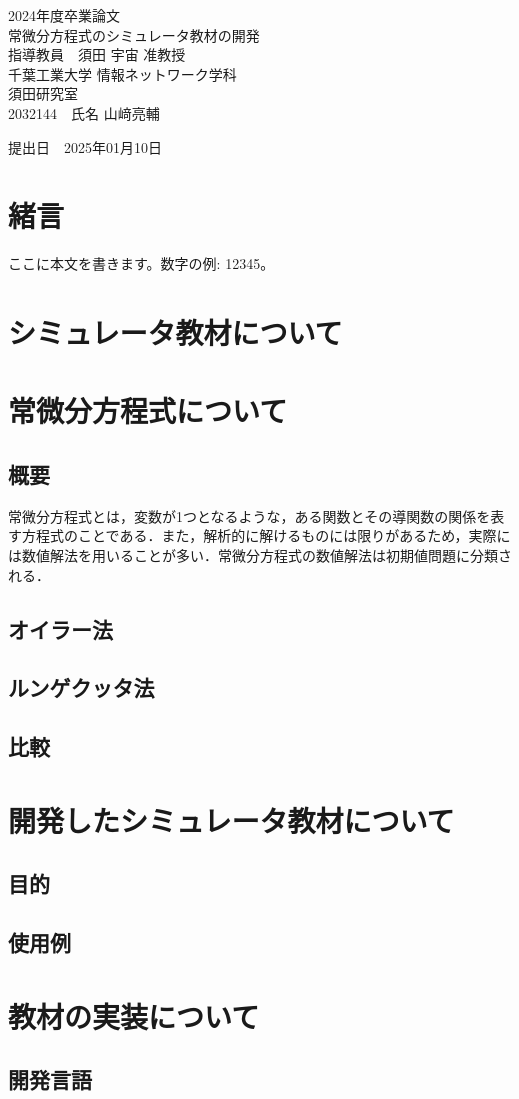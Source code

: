 \documentclass[a4paper, 12pt]{ltjsarticle}
\newcommand{\coverpage}{
\begin{titlepage}
\begin{center}
\vspace*{1.5cm}

{\LARGE 2024年度卒業論文}\\[2cm] %

{\Huge {常微分方程式のシミュレータ教材の開発}}\\[4cm] %

{\LARGE 指導教員　須田 宇宙 准教授}\\[2cm] %
{\LARGE 千葉工業大学 情報ネットワーク学科}\\[0.5cm] %

{\LARGE 須田研究室}\\[2.5cm] %

{\LARGE {2032144}　氏名 {山﨑亮輔}} \\[1.5cm] %

\vfill
\end{center}

\begin{flushright}
{\LARGE 提出日　\textnormal{2025年01月10日}}\\[1.5cm] %
\end{flushright}

\vfill
\end{titlepage}
}
\begin{document}
\coverpage

\tableofcontents

\clearpage

\section{緒言}
ここに本文を書きます。数字の例: 12345。
\clearpage
\section{シミュレータ教材について}
\clearpage
\section{常微分方程式について}
\subsection{概要}
常微分方程式とは，変数が1つとなるような，ある関数とその導関数の関係を表す方程式のことである．また，解析的に解けるものには限りがあるため，実際には数値解法を用いることが多い．常微分方程式の数値解法は初期値問題に分類される．
\subsection{オイラー法}
\subsection{ルンゲクッタ法}
\subsection{比較}
\clearpage
\section{開発したシミュレータ教材について}
\subsection{目的}
\subsection{使用例}
\clearpage
\section{教材の実装について}
\subsection{開発言語}
\end{document}
